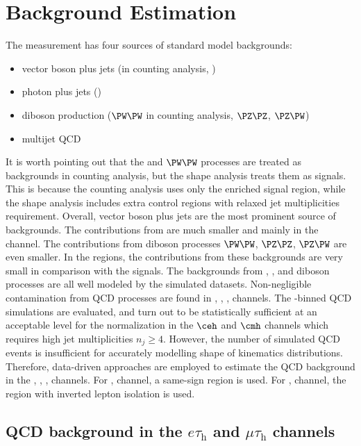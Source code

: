 \section{Background Estimation}
\label{sec:analysis:background}


The \BWl measurement has four sources of standard model backgrounds:

\begin{itemize}
    \item vector boson plus jets (\wjets in counting analysis, \zjets)
    \item photon plus jets (\gjets)
    \item diboson production ($\PW\PW$ in counting analysis, $\PZ\PZ$, $\PZ\PW$)
    \item multijet QCD
\end{itemize}

It is worth pointing out that the \wjets and $\PW\PW$ processes are treated as backgrounds in counting analysis, but the shape analysis treats them as signals. This is because the counting analysis uses only the \ttbar enriched signal region, while the shape analysis includes extra control regions with relaxed jet multiplicities requirement. Overall, vector boson plus jets are the most prominent source of backgrounds. The contributions from \gjets are much smaller and mainly in the \ceh channel. The contributions from diboson processes $\PW\PW$, $\PZ\PZ$, $\PZ\PW$ are even smaller. In the \ttbar regions, the contributions from these backgrounds are very small in comparison with the signals. The backgrounds from \zjets, \wjets, \gjets and diboson processes are all well modeled by the simulated datasets. Non-negligible contamination from QCD processes are found in \cet, \cmt, \ceh, \cmh channels. The \HT-binned QCD simulations are evaluated, and turn out to be statistically sufficient at an acceptable level for the normalization in the $\ceh$ and $\cmh$ channels which requires high jet multiplicities $n_j\geq 4$. However, the number of simulated QCD events is insufficient for accurately modelling shape of kinematics distributions. Therefore, data-driven approaches are employed to estimate the QCD background in the \cet, \cmt, \ceh, \cmh channels. For \cet, \cmt channel, a same-sign region is used. For \ceh, \cmh channel, the region with inverted lepton isolation is used.



\subsection{QCD background in the $e \tau_\mathrm{h}$ and $\mu \tau_\mathrm{h}$ channels}

